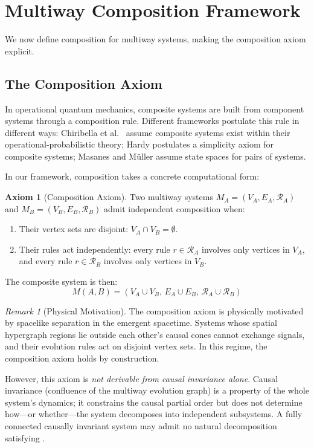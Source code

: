 \documentclass[11pt,a4paper]{article}
\theoremstyle{definition}
\newtheorem{axiom}[theorem]{Axiom}
\theoremstyle{remark}
\newtheorem{remark}[theorem]{Remark}
\begin{document}
\section{Multiway Composition Framework}
\label{sec:framework}

We now define composition for multiway systems, making the composition
axiom explicit.

\subsection{The Composition Axiom}

In operational quantum mechanics, composite systems are built from
component systems through a composition rule. Different frameworks
postulate this rule in different ways: Chiribella et al.\
\cite{chiribella2011informational} assume composite systems exist within
their operational-probabilistic theory; Hardy \cite{hardy2001quantum}
postulates a simplicity axiom for composite systems; Masanes and M\"uller
\cite{masanes2011general} assume state spaces for pairs of systems.

In our framework, composition takes a concrete computational form:

\begin{axiom}[Composition Axiom]
\label{ax:composition}
Two multiway systems $M_A = (V_A, E_A, \mathcal{R}_A)$ and
$M_B = (V_B, E_B, \mathcal{R}_B)$ admit independent composition when:
\begin{enumerate}
\item Their vertex sets are disjoint: $V_A \cap V_B = \emptyset$.
\item Their rules act independently: every rule $r \in \mathcal{R}_A$
  involves only vertices in $V_A$, and every rule $r \in \mathcal{R}_B$
  involves only vertices in $V_B$.
\end{enumerate}
The composite system is then:
\begin{equation}
M(A,B) = (V_A \cup V_B,\, E_A \cup E_B,\, \mathcal{R}_A \cup \mathcal{R}_B)
\end{equation}
\end{axiom}

\begin{remark}[Physical Motivation]
The composition axiom is physically motivated by spacelike separation
in the emergent spacetime. Systems whose spatial hypergraph regions
lie outside each other's causal cones cannot exchange signals, and
their evolution rules act on disjoint vertex sets. In this regime,
the composition axiom holds by construction.

However, this axiom is \textit{not derivable from causal invariance
alone}. Causal invariance (confluence of the multiway evolution graph)
is a property of the whole system's dynamics; it constrains the causal
partial order but does not determine how---or whether---the system
decomposes into independent subsystems. A fully connected causally
invariant system may admit no natural decomposition satisfying
.
\end{remark}
\end{document}
